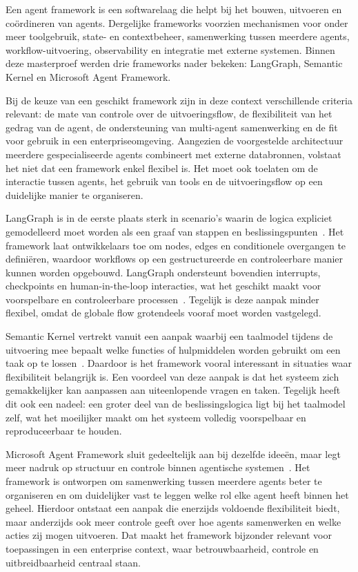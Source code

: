 Een agent framework is een softwarelaag die helpt bij het bouwen, uitvoeren en coördineren van agents. Dergelijke frameworks voorzien mechanismen voor onder meer toolgebruik, state- en contextbeheer, samenwerking tussen meerdere agents, workflow-uitvoering, observability en integratie met externe systemen. Binnen deze masterproef werden drie frameworks nader bekeken: LangGraph, Semantic Kernel en Microsoft Agent Framework.

Bij de keuze van een geschikt framework zijn in deze context verschillende criteria relevant: de mate van controle over de uitvoeringsflow, de flexibiliteit van het gedrag van de agent, de ondersteuning van multi-agent samenwerking en de fit voor gebruik in een enterpriseomgeving. Aangezien de voorgestelde architectuur meerdere gespecialiseerde agents combineert met externe databronnen, volstaat het niet dat een framework enkel flexibel is. Het moet ook toelaten om de interactie tussen agents, het gebruik van tools en de uitvoeringsflow op een duidelijke manier te organiseren.

LangGraph is in de eerste plaats sterk in scenario's waarin de logica expliciet gemodelleerd moet worden als een graaf van stappen en beslissingspunten~\cite{langchain2024langraphdocs}. Het framework laat ontwikkelaars toe om nodes, edges en conditionele overgangen te definiëren, waardoor workflows op een gestructureerde en controleerbare manier kunnen worden opgebouwd. LangGraph ondersteunt bovendien interrupts, checkpoints en human-in-the-loop interacties, wat het geschikt maakt voor voorspelbare en controleerbare processen~\cite{langchain2024multiagent}. Tegelijk is deze aanpak minder flexibel, omdat de globale flow grotendeels vooraf moet worden vastgelegd.

Semantic Kernel vertrekt vanuit een aanpak waarbij een taalmodel tijdens de uitvoering mee bepaalt welke functies of hulpmiddelen worden gebruikt om een taak op te lossen~\cite{microsoft2024semantickernel}. Daardoor is het framework vooral interessant in situaties waar flexibiliteit belangrijk is. Een voordeel van deze aanpak is dat het systeem zich gemakkelijker kan aanpassen aan uiteenlopende vragen en taken. Tegelijk heeft dit ook een nadeel: een groter deel van de beslissingslogica ligt bij het taalmodel zelf, wat het moeilijker maakt om het systeem volledig voorspelbaar en reproduceerbaar te houden.

Microsoft Agent Framework sluit gedeeltelijk aan bij dezelfde ideeën, maar legt meer nadruk op structuur en controle binnen agentische systemen~\cite{microsoft2024agentframework,venturebeat2024maf}. Het framework is ontworpen om samenwerking tussen meerdere agents beter te organiseren en om duidelijker vast te leggen welke rol elke agent heeft binnen het geheel. Hierdoor ontstaat een aanpak die enerzijds voldoende flexibiliteit biedt, maar anderzijds ook meer controle geeft over hoe agents samenwerken en welke acties zij mogen uitvoeren. Dat maakt het framework bijzonder relevant voor toepassingen in een enterprise context, waar betrouwbaarheid, controle en uitbreidbaarheid centraal staan.

